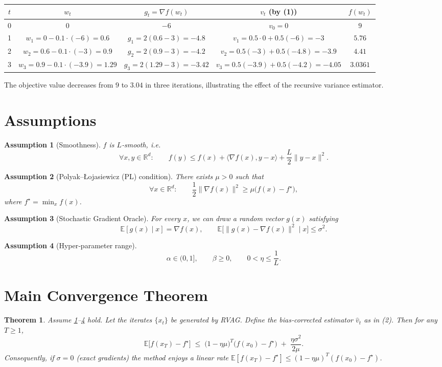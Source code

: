 \documentclass{article}
\newtheorem{theorem}{Theorem}
\newtheorem{assumption}{Assumption}
\newcommand{\E}{\mathbb{E}}
\newcommand{\R}{\mathbb{R}}
\begin{document}
\begin{center}
\begin{tabular}{c|c|c|c|c}
$t$ & $w_{t}$ & $g_{t}= \nabla f(w_{t})$ & $v_{t}$ (by (1)) & $f(w_{t})$\\ \hline
0 & $0$ & $-6$ & $v_{0}=0$ & $9$\\
1 & $w_{1}=0-0.1\cdot(-6)=0.6$ & $g_{1}=2(0.6-3)=-4.8$ &
$v_{1}=0.5\cdot0+0.5(-6)=-3$ & $5.76$\\
2 & $w_{2}=0.6-0.1\cdot(-3) =0.9$ &
$g_{2}=2(0.9-3)=-4.2$ &
$v_{2}=0.5(-3)+0.5(-4.8)=-3.9$ & $4.41$\\
3 & $w_{3}=0.9-0.1\cdot(-3.9)=1.29$ &
$g_{3}=2(1.29-3)=-3.42$ &
$v_{3}=0.5(-3.9)+0.5(-4.2)=-4.05$ & $3.0361$\\
\end{tabular}
\end{center}
The objective value decreases from $9$ to $3.04$ in three iterations, illustrating the effect of the recursive variance estimator.

\newpage
\section*{Assumptions}
\begin{assumption}[Smoothness]\label{as:smooth}
$f$ is $L$‑smooth, i.e.
\[
\forall x,y\in\R^{d}:\qquad 
f(y)\le f(x)+\langle\nabla f(x),y-x\rangle+ \frac{L}{2}\|y-x\|^{2}.
\]
\end{assumption}
\begin{assumption}[Polyak–Łojasiewicz (PL) condition]\label{as:pl}
There exists $\mu>0$ such that
\[
\forall x\in\R^{d}:\qquad 
\frac{1}{2}\|\nabla f(x)\|^{2}\ge \mu\bigl(f(x)-f^{\star}\bigr),
\]
where $f^{\star}= \min_{x}f(x)$.
\end{assumption}
\begin{assumption}[Stochastic Gradient Oracle]\label{as:stoch}
For every $x$, we can draw a random vector $g(x)$ satisfying
\[
\E[g(x)\mid x]=\nabla f(x),\qquad 
\E\!\bigl[\|g(x)-\nabla f(x)\|^{2}\mid x\bigr]\le\sigma^{2}.
\]
\end{assumption}
\begin{assumption}[Hyper‑parameter range]\label{as:hyper}
\[
\alpha\in(0,1],\qquad \beta\ge0,\qquad 
0<\eta\le \frac{1}{L}.
\]
\end{assumption}

\section*{Main Convergence Theorem}
\begin{theorem}\label{thm:linear}
Assume \ref{as:smooth}–\ref{as:hyper} hold. Let the iterates $\{x_{t}\}$ be generated by RVAG. Define the bias‑corrected estimator $\widehat v_{t}$ as in (2). Then for any $T\ge1$,
\[
\E\!\bigl[f(x_{T})-f^{\star}\bigr]
\;\le\;
\bigl(1-\eta\mu\bigr)^{T}\bigl(f(x_{0})-f^{\star}\bigr)
\;+\;
\frac{\eta\sigma^{2}}{2\mu}.
\tag{4}
\]
Consequently, if $\sigma=0$ (exact gradients) the method enjoys a linear rate
$\E[f(x_{T})-f^{\star}]\le (1-\eta\mu)^{T}(f(x_{0})-f^{\star})$.
\end{theorem}
\end{document}
